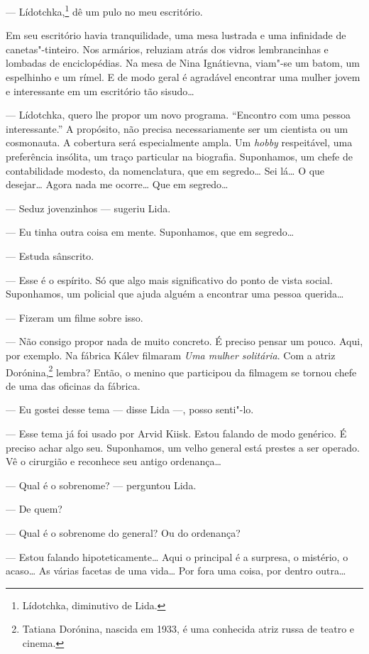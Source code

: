 --- Lídotchka,\footnote{Lídotchka, diminutivo de Lida.} dê um pulo no
meu escritório.

Em seu escritório havia tranquilidade, uma mesa lustrada e uma
infinidade de canetas"-tinteiro. Nos armários, reluziam atrás dos vidros
lembrancinhas e lombadas de enciclopédias. Na mesa de Nina Ignátievna,
viam"-se um batom, um espelhinho e um rímel. E de modo geral é agradável
encontrar uma mulher jovem e interessante em um escritório tão sisudo\ldots{}

--- Lídotchka, quero lhe propor um novo programa. ``Encontro com uma
pessoa interessante.'' A propósito, não precisa necessariamente ser um
cientista ou um cosmonauta. A cobertura será especialmente ampla. Um
\emph{hobby} respeitável, uma preferência insólita, um traço particular
na biografia. Suponhamos, um chefe de contabilidade modesto, da
nomenclatura, que em segredo\ldots{} Sei lá\ldots{} O que desejar\ldots{} Agora nada me
ocorre\ldots{} Que em segredo\ldots{}

--- Seduz jovenzinhos --- sugeriu Lida.

--- Eu tinha outra coisa em mente. Suponhamos, que em segredo\ldots{}

--- Estuda sânscrito.

--- Esse é o espírito. Só que algo mais significativo do ponto de vista
social. Suponhamos, um policial que ajuda alguém a encontrar uma pessoa
querida\ldots{}

--- Fizeram um filme sobre isso.

--- Não consigo propor nada de muito concreto. É preciso pensar um
pouco. Aqui, por exemplo. Na fábrica Kálev filmaram \emph{Uma mulher
solitária}. Com a atriz Dorónina,\footnote{Tatiana Dorónina, nascida em
  1933, é uma conhecida atriz russa de teatro e cinema.} lembra? Então,
o menino que participou da filmagem se tornou chefe de uma das oficinas
da fábrica.

--- Eu gostei desse tema --- disse Lida ---, posso senti"-lo.

--- Esse tema já foi usado por Arvid Kiisk. Estou falando de modo
genérico. É preciso achar algo seu. Suponhamos, um velho general está
prestes a ser operado. Vê o cirurgião e reconhece seu antigo
ordenança\ldots{}

--- Qual é o sobrenome? --- perguntou Lida.

--- De quem?

--- Qual é o sobrenome do general? Ou do ordenança?

--- Estou falando hipoteticamente\ldots{} Aqui o principal é a surpresa, o
mistério, o acaso\ldots{} As várias facetas de uma vida\ldots{} Por fora uma
coisa, por dentro outra\ldots{}

